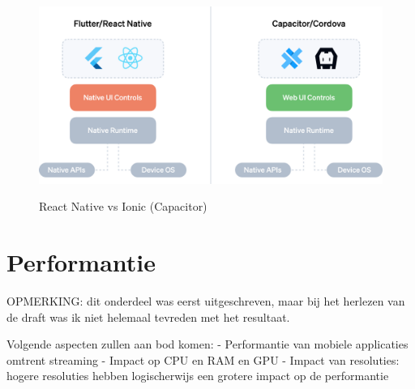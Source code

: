 \begin{figure}
  \centering
  \includegraphics[width=0.9\linewidth]{img/ReactIonic}
  \caption{React Native vs Ionic (Capacitor)}
  \label{fig:React Native vs Ionic (Capacitor)} \autocite{Bron19IMG}
\end{figure}


\section{Performantie}
\label{sec:performantie}

OPMERKING: dit onderdeel was eerst uitgeschreven, maar bij het herlezen van de draft was ik niet helemaal tevreden met het resultaat. 

Volgende aspecten zullen aan bod komen:
- Performantie van mobiele applicaties omtrent streaming
- Impact op CPU en RAM en GPU 
- Impact van resoluties: hogere resoluties hebben logischerwijs een grotere impact op de performantie





